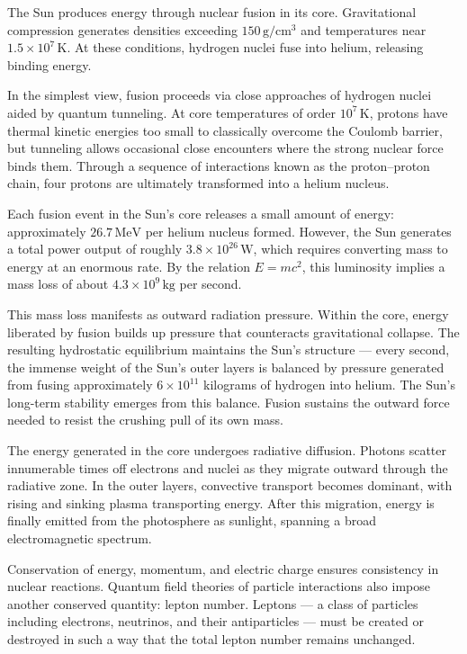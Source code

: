 The Sun produces energy through nuclear fusion in its core. Gravitational compression generates densities exceeding $150\,\text{g}/\text{cm}^3$ and temperatures near $1.5 \times 10^7\,\text{K}$. At these conditions, hydrogen nuclei fuse into helium, releasing binding energy.

In the simplest view, fusion proceeds via close approaches of hydrogen nuclei aided by quantum tunneling. At core temperatures of order $10^7\,\text{K}$, protons have thermal kinetic energies too small to classically overcome the Coulomb barrier, but tunneling allows occasional close encounters where the strong nuclear force binds them. Through a sequence of interactions known as the proton–proton chain, four protons are ultimately transformed into a helium nucleus. 

Each fusion event in the Sun's core releases a small amount of energy: approximately $26.7\,\text{MeV}$ per helium nucleus formed. However, the Sun generates a total power output of roughly $3.8 \times 10^{26}\,\text{W}$, which requires converting mass to energy at an enormous rate. By the relation $E = mc^2$, this luminosity implies a mass loss of about $4.3 \times 10^9\,\text{kg}$ per second.

This mass loss manifests as outward radiation pressure. Within the core, energy liberated by fusion builds up pressure that counteracts gravitational collapse. The resulting hydrostatic equilibrium maintains the Sun's structure — every second, the immense weight of the Sun's outer layers is balanced by pressure generated from fusing approximately $6 \times 10^{11}$ kilograms of hydrogen into helium. The Sun's long-term stability emerges from this balance. Fusion sustains the outward force needed to resist the crushing pull of its own mass.

The energy generated in the core undergoes radiative diffusion. Photons scatter innumerable times off electrons and nuclei as they migrate outward through the radiative zone. In the outer layers, convective transport becomes dominant, with rising and sinking plasma transporting energy. After this migration, energy is finally emitted from the photosphere as sunlight, spanning a broad electromagnetic spectrum.

Conservation of energy, momentum, and electric charge ensures consistency in nuclear reactions. Quantum field theories of particle interactions also impose another conserved quantity: lepton number. Leptons — a class of particles including electrons, neutrinos, and their antiparticles — must be created or destroyed in such a way that the total lepton number remains unchanged.

